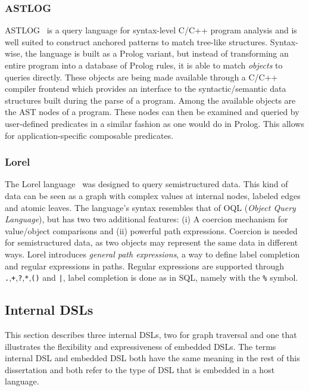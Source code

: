 \subsubsection*{ASTLOG}
ASTLOG~\cite{Crew:1997} is a query language for syntax-level C/C++ program analysis and is well suited to construct anchored patterns to match tree-like structures. Syntax-wise, the language is built as a Prolog variant, but instead of transforming an entire program into a database of Prolog rules, it is able to match \textit{objects} to queries directly. These objects are being made available through a C/C++ compiler frontend which provides an interface to the syntactic/semantic data structures built during the parse of a program. Among the available objects are the AST nodes of a program. These nodes can then be examined and queried by user-defined predicates in a similar fashion as one would do in Prolog. This allows for application-specific composable predicates. 

\subsubsection*{Lorel}
The Lorel language~\cite{abiteboul1997lorel} was designed to query semistructured data. This kind of data can be seen as a graph with complex values at internal nodes, labeled edges and atomic leaves. The language's syntax resembles that of OQL (\textit{Object Query Language}), but has two two additional features: (i) A coercion mechanism for value/object comparisons and (ii) powerful path expressions. Coercion is needed for semistructured data, as two objects may represent the same data in different ways. Lorel introduces \textit{general path expressions}, a way to define label completion and regular expressions in paths. Regular expressions are supported through \texttt{.},\texttt{+},\texttt{?},\texttt{*},\texttt{()} and \texttt{|}, label completion is done as in SQL, namely with the \texttt{\%} symbol.



\subsection{Internal DSLs}
 This section describes three internal DSLs, two for graph traversal and one that illustrates the flexibility and expressiveness of embedded DSLs. The terms internal DSL and embedded DSL both have the same meaning in the rest of this dissertation and both refer to the type of DSL that is embedded in a host language.

